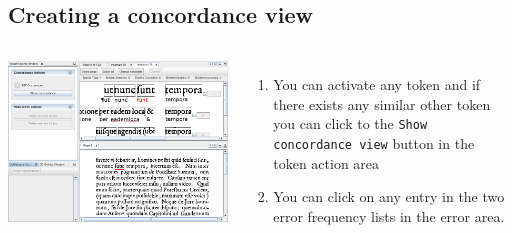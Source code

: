 \subsection{Creating a concordance view}
\begin{frame}
	\begin{columns}
		\includegraphics[width=1.0\textwidth]{../presentations/images/concordanceview1.png}
		\begin{enumerate}
			\item You can activate any token and if there exists any similar other
				token you can click to the \texttt{Show concordance view} button in the
				token action area
			\item You can click on any entry in the two error frequency lists in the
				error area.
		\end{enumerate}
	\end{columns}
\end{frame}

